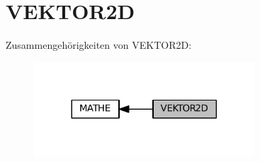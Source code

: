 \hypertarget{group__VEKTOR2D}{}\section{V\+E\+K\+T\+O\+R2D}
\label{group__VEKTOR2D}
Zusammengehörigkeiten von V\+E\+K\+T\+O\+R2D\+:\nopagebreak
\begin{figure}[H]
\begin{center}
\leavevmode
\includegraphics[width=233pt]{group__VEKTOR2D}
\end{center}
\end{figure}
